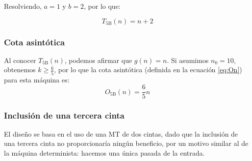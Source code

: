 Resolviendo, $a=1$ y $b=2$, por lo que:

\begin{equation}
    T_{\mathrm{5B}}(n) = n + 2
\end{equation}


\subsubsection*{Cota asintótica}
Al conocer $T_{\mathrm{5B}}(n)$, podemos afirmar que $g(n) = n$. Si asumimos $n_0 = 10$, obtenemos $k \geq \frac{6}{5}$, por lo que la cota asintótica (definida en la ecuación \ref{eq:On}) para esta máquina es:
\begin{equation}
    O_{\mathrm{5B}}(n) = \frac{6}{5} n
\end{equation}



\subsubsection*{Inclusión de una tercera cinta}
El diseño se basa en el uso de una MT de dos cintas, dado que la inclusión de una tercera cinta no proporcionaría ningún beneficio, por un motivo similar al de la máquina determinista: hacemos una única pasada de la entrada.
